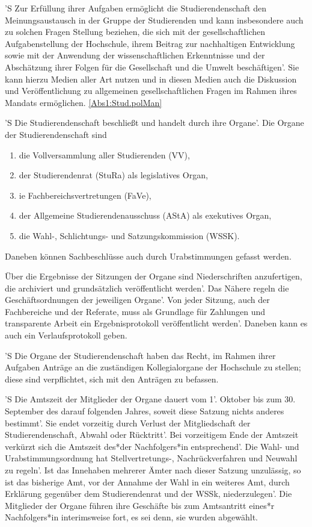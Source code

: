 \documentclass[fontsize=12pt,parskip=half]{scrartcl}
\begin{document}
\begin{contract}
  'S Zur Erfüllung ihrer Aufgaben ermöglicht die Studierendenschaft den
  Meinungsaustausch in der Gruppe der Studierenden und kann insbesondere auch zu
  solchen Fragen Stellung beziehen, die sich mit der gesellschaftlichen
  Aufgabenstellung der Hochschule, ihrem Beitrag zur nachhaltigen Entwicklung
  sowie mit der Anwendung der wissenschaftlichen Erkenntnisse und der
  Abschätzung ihrer Folgen für die Gesellschaft und die Umwelt beschäftigen'. Sie
  kann hierzu Medien aller Art nutzen und in diesen Medien auch die Diskussion
  und Veröffentlichung zu allgemeinen gesellschaftlichen Fragen im Rahmen ihres
  Mandats ermöglichen. \ref{Abs1:Stud.polMan}



  'S Die Studierendenschaft beschließt und handelt durch ihre Organe'. Die Organe
  der Studierendenschaft sind
  \begin{enumerate}[\qquad 1.]
    \item die Vollversammlung aller Studierenden (VV),
    \item der Studierendenrat (StuRa) als legislatives Organ,
    \item ie Fachbereichsvertretungen (FaVe),
    \item der Allgemeine Studierendenausschuss (AStA) als exekutives Organ,
    \item die Wahl-, Schlichtungs- und Satzungskommission (WSSK).
  \end{enumerate}
  Daneben können Sachbeschlüsse auch durch Urabstimmungen gefasst werden.

  Über die Ergebnisse der Sitzungen der Organe sind Niederschriften
  anzufertigen, die archiviert und grundsätzlich veröffentlicht werden'. Das
  Nähere regeln die Geschäftsordnungen der jeweiligen Organe'. Von jeder Sitzung,
  auch der Fachbereiche und der Referate, muss als Grundlage für Zahlungen und
  transparente Arbeit ein Ergebnisprotokoll veröffentlicht werden'. Daneben kann
  es auch ein Verlaufsprotokoll geben.

  'S Die Organe der Studierendenschaft haben das Recht, im Rahmen ihrer Aufgaben
  Anträge an die zuständigen Kollegialorgane der Hochschule zu stellen; diese
  sind verpflichtet, sich mit den Anträgen zu befassen.

  'S Die Amtszeit der Mitglieder der Organe dauert vom 1'. Oktober bis zum 30.
  September des darauf folgenden Jahres, soweit diese Satzung nichts anderes
  bestimmt'. Sie endet vorzeitig durch Verlust der Mitgliedschaft der
  Studierendenschaft, Abwahl oder Rücktritt'. Bei vorzeitigem Ende der Amtszeit
  verkürzt sich die Amtszeit des*der Nachfolgers*in entsprechend'. Die Wahl- und
  Urabstimmungsordnung hat Stellvertretungs-, Nachrückverfahren und Neuwahl zu
  regeln'. Ist das Innehaben mehrerer Ämter nach dieser Satzung unzulässig, so
  ist das bisherige Amt, vor der Annahme der Wahl in ein weiteres Amt, durch
  Erklärung gegenüber dem Studierendenrat und der WSSk, niederzulegen'. Die
  Mitglieder der Organe führen ihre Geschäfte bis zum Amtsantritt eines*r
  Nachfolgers*in interimsweise fort, es sei denn, sie wurden abgewählt.


\end{contract}
\end{document}

